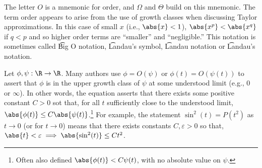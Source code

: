 The letter $O$ is a mnemonic for order, and $\Omega $ and $\Theta $ build on this mnemonic.
The term order appears to arise from the use of growth classes when discussing Taylor approximations.
In this case of small $x$ (i.e., $\abs{x} < 1$), $\abs{x^p} < \abs{x^q}$ if $q < p$ and so higher order terms are ``smaller'' and ``negligible.''
This notation is sometimes called \t{Big O notation}, \t{Landau's symbol}, \t{Landau notation} or \t{Landau's notation}.

Let $\phi , \psi : \R  \to \R $.
Many authors use $\phi  = O(\psi )$ or $\phi (t) = O(\psi (t))$ to assert that $\phi $ is in the upper growth class of $\psi $ at some understood limit (e.g., $0$ or $\infty$).
In other words, the equation asserts that there exists some positive constant $C > 0$ sot that, for all $t$ sufficiently close to the understood limit, $\abs{\phi (t)} \leq C \abs{\psi (t)}$.\footnote{Often also defined $\abs{\phi (t)} < C\psi (t)$, with no absolute value on $\psi $.}
For example, the statement $\sin^2(t) = P(t^2)$ as $t \to 0$ (or for $t \to 0$) means that there exists constants $C, \varepsilon  > 0$ so that, $\abs{t} < \varepsilon  \implies \abs{\sin^2(t)} \leq Ct^2$.
